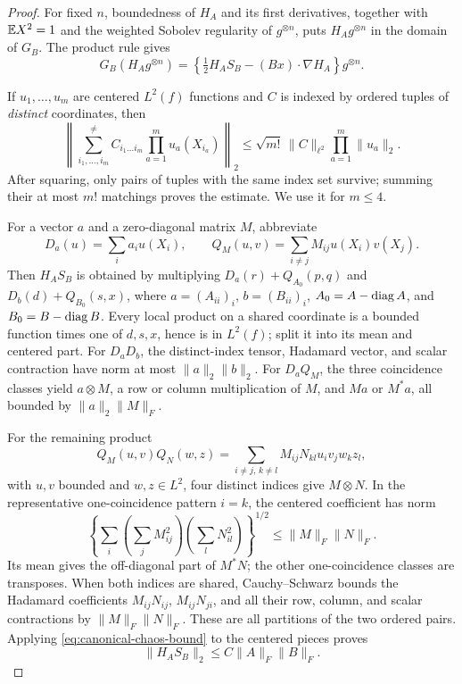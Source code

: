 \begin{proof}
For fixed \(n\), boundedness of \(H_A\) and its first derivatives, together
with \(\mathbb E X^2=1\) and the weighted Sobolev regularity of \(g^{\otimes n}\), puts
\(H_Ag^{\otimes n}\) in the domain of \(G_B\).  The product rule gives
\begin{equation}
 G_B(H_Ag^{\otimes n})
 =\left\{\tfrac12H_AS_B-(Bx)\cdot\nabla H_A\right\}g^{\otimes n}.
 \label{eq:coordinate-function-generator-product}
\end{equation}

If $u_1,\ldots,u_m$ are centered $L^2(f)$ functions and \(C\) is indexed by
ordered tuples of
\emph{distinct} coordinates, then
\begin{equation}
 \left\|\sum_{i_1,\ldots,i_m}^{\ne}
 C_{i_1\ldots i_m}\prod_{a=1}^m u_a(X_{i_a})\right\|_2
 \le\sqrt{m!}\,\|C\|_{\ell^2}
                     \prod_{a=1}^m\|u_a\|_2.
 \label{eq:canonical-chaos-bound}
\end{equation}
After squaring, only pairs of tuples with the same index set survive; summing
their at most \(m!\) matchings proves the estimate.  We use it for \(m\le4\).

For a vector \(a\) and a zero-diagonal matrix \(M\), abbreviate
\[
 D_a(u)=\sum_i a_i u(X_i),\qquad
 Q_M(u,v)=\sum_{i\ne j}M_{ij}u(X_i)v(X_j).
\]
Then \(H_AS_B\) is obtained by multiplying
\(D_{a}(r)+Q_{A_0}(p,q)\) and
\(D_{b}(d)+Q_{B_0}(s,x)\), where
$a=(A_{ii})_i$, $b=(B_{ii})_i$,
$A_0=A-\operatorname{diag} A$, and
$B_0=B-\operatorname{diag} B$.
Every local product on a shared coordinate is a bounded function times one of
\(d,s,x\), hence is in \(L^2(f)\); split it into its mean and centered part.
For \(D_aD_b\), the distinct-index tensor, Hadamard vector, and scalar
contraction have norm at most \(\|a\|_2\|b\|_2\).  For \(D_aQ_M\), the
three coincidence classes yield \(a\otimes M\), a row or column multiplication
of \(M\), and \(Ma\) or \(M^*a\), all bounded by
\(\|a\|_2\|M\|_F\).

For the remaining product
\[
 Q_M(u,v)Q_N(w,z)
 =\sum_{i\ne j,\,k\ne l}M_{ij}N_{kl}
                         u_i v_j w_k z_l,
\]
with \(u,v\) bounded and \(w,z\in L^2\), four distinct indices give
\(M\otimes N\).  In the representative one-coincidence pattern \(i=k\), the
centered coefficient has norm
\[
 \left\{\sum_i\left(\sum_j M_{ij}^2\right)
                    \left(\sum_l N_{il}^2\right)\right\}^{1/2}
 \le\|M\|_F\|N\|_F.
\]
Its mean gives the off-diagonal part of \(M^*N\); the other one-coincidence
classes are transposes.  When both indices are shared, Cauchy--Schwarz bounds
the Hadamard coefficients \(M_{ij}N_{ij}\), \(M_{ij}N_{ji}\), and all their
row, column, and scalar contractions by \(\|M\|_F\|N\|_F\).  These are all
partitions of the two ordered pairs.  Applying
\eqref{eq:canonical-chaos-bound} to the centered pieces proves
\begin{equation}
 \|H_AS_B\|_2\le C\|A\|_F\|B\|_F.
 \label{eq:coordinate-function-score-bound}
\end{equation}


\end{proof}
